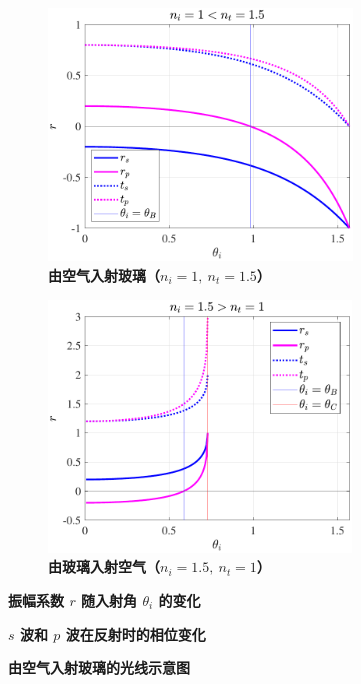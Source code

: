 \documentclass[UTF8]{report}
\theoremstyle{MyLineTheoremStyle} %
\theoremstyle{MyBlockTheoremStyle} %
\theoremstyle{MySubsubsectionStyle} %
\begin{document}
\begin{figure}[H]\centering
\begin{subfigure}[t]{0.49\textwidth}\centering
    \includegraphics[height=190pt]{assets/1,2/2024-09-15_10-53-31.pdf}
    \caption{\bfseries 由空气入射玻璃（$n_i = 1,\ n_t = 1.5$） }
\end{subfigure}
\begin{subfigure}[t]{0.49\textwidth}\centering
    \includegraphics[height=190pt]{assets/1,2/2024-09-15_10-53-27.pdf}
    \caption{\bfseries 由玻璃入射空气（$n_i = 1.5,\ n_t = 1$） }
\end{subfigure}
\caption{\bfseries 振幅系数 $r$ 随入射角 $\theta_i$ 的变化 }\label{振幅系数随入射角的变化}
\end{figure}

\begin{figure}[ht]\centering
    
    \caption{\bfseries $s$ 波和 $p$ 波在反射时的相位变化}\label{反射时 s 波和 p 波的相位变化}
\end{figure}

\begin{figure}[H]\centering

\caption{\bfseries 由空气入射玻璃的光线示意图}\label{反射示意图}
\end{figure}
\end{document}
